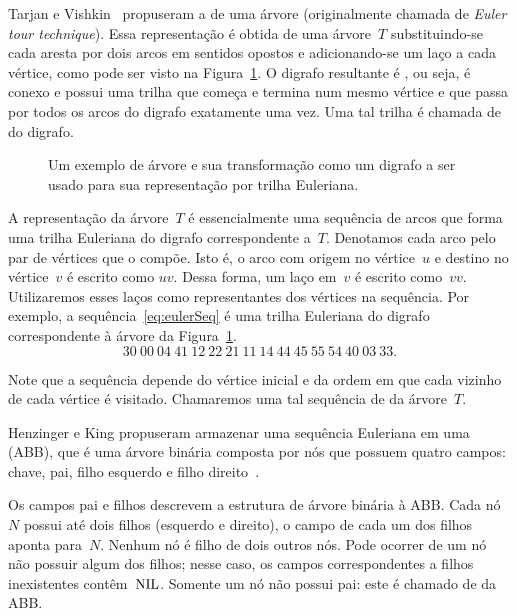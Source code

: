 Tarjan e Vishkin~\cite{tarjan1985} propuseram a  de uma árvore (originalmente chamada de \textit{Euler tour technique}).
Essa representação é obtida de uma árvore~$T$ substituindo-se cada aresta por dois arcos em sentidos opostos e adicionando-se um laço a cada vértice, como pode ser visto na Figura~\ref{fig:exemploSeqEuler}. O digrafo resultante é , ou seja, é conexo e possui uma trilha que começa e termina num mesmo vértice e que passa por todos os arcos do digrafo exatamente uma vez. Uma tal trilha é chamada de  do digrafo.


\begin{figure}[htb]
\centering


\caption{Um exemplo de árvore e sua transformação como um digrafo a ser usado para sua representação por trilha Euleriana.}
\label{fig:exemploSeqEuler}
\end{figure}

A representação da árvore~$T$ é essencialmente uma sequência de arcos que forma uma trilha Euleriana do digrafo correspondente a~$T$.
Denotamos cada arco pelo par de vértices que o compõe.
Isto é, o arco com origem no vértice~$u$ e destino no vértice~$v$ é escrito como $uv$.
Dessa forma, um laço em~$v$ é escrito como~$vv$.
Utilizaremos esses laços como representantes dos vértices na sequência. 
Por exemplo, a sequência~\eqref{eq:eulerSeq} é uma trilha Euleriana do digrafo correspondente à árvore da Figura~\ref{fig:exemploSeqEuler}.
\begin{equation}
30~00~04~41~12~22~21~11~14~44~45~55~54~40~03~33.\label{eq:eulerSeq}  
\end{equation}

Note que a sequência depende do vértice inicial e da ordem em que cada vizinho de cada vértice é visitado. Chamaremos uma tal sequência de  da árvore~$T$.

Henzinger e King \cite{HenzingerKing} propuseram armazenar uma sequência Euleriana em uma  (ABB), que é uma árvore binária composta por nós que possuem  quatro campos: chave, pai, filho esquerdo e filho direito~\cite{CLRS}.

Os campos pai e filhos descrevem a estrutura de árvore binária à ABB. Cada nó~$N$ possui até dois filhos (esquerdo e direito), o campo  de cada um dos filhos aponta para~$N$. Nenhum nó é filho de dois outros nós. Pode ocorrer de um nó não possuir algum dos filhos; nesse caso, os campos correspondentes a filhos inexistentes contêm~$\text{NIL}$. Somente um nó não possui pai: este é chamado de  da ABB.

